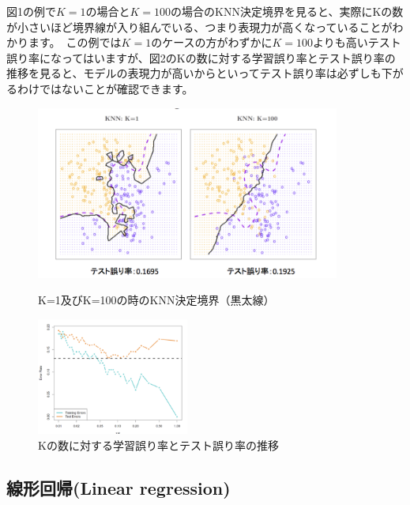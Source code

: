 \documentclass[uplatex]{jsarticle}
\begin{document}
図1の例で$K=1の場合とK=100$の場合のKNN決定境界を見ると、実際にKの数が小さいほど境界線が入り組んでいる、つまり表現力が高くなっていることがわかります。\
この例では$K=1$のケースの方がわずかに$K=100$よりも高いテスト誤り率になってはいますが、図2のKの数に対する学習誤り率とテスト誤り率の推移を見ると、モデルの表現力が高いからといってテスト誤り率は必ずしも下がるわけではないことが確認できます。\
\begin{figure}[htbp]
\begin{minipage}{0.7\hsize}
 \begin{center}
  \includegraphics[width=100mm]{img/knn_knum.png}
 \end{center}
 \caption{K=1及びK=100の時のKNN決定境界（黒太線）}
 \label{fig:one}
\end{minipage}
\begin{minipage}{0.3\hsize}
 \begin{center}
  \includegraphics[width=50mm]{img/knn_eror.png}
 \end{center}
 \caption{Kの数に対する学習誤り率とテスト誤り率の推移}
 \label{fig:two}
\end{minipage}
\end{figure}

\subsection{線形回帰(Linear regression)}
\end{document}
